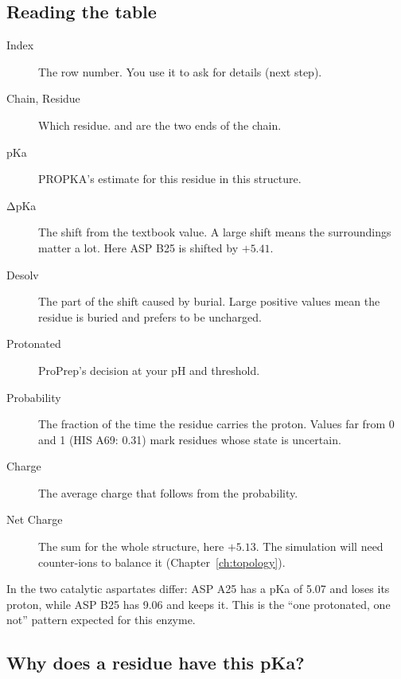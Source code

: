 \subsection{Reading the table}

\begin{description}
  \item[Index] The row number. You use it to ask for details (next step).
  \item[Chain, Residue] Which residue.  and  are
        the two ends of the chain.
  \item[pKa] PROPKA's estimate for this residue in this structure.
  \item[ΔpKa] The shift from the textbook value. A large shift means the
        surroundings matter a lot. Here ASP B25 is shifted by $+5.41$.
  \item[Desolv] The part of the shift caused by burial. Large positive values
        mean the residue is buried and prefers to be uncharged.
  \item[Protonated] ProPrep's decision at your pH and threshold.
  \item[Probability] The fraction of the time the residue carries the proton.
        Values far from 0 and 1 (HIS A69: 0.31) mark residues whose state is
        uncertain.
  \item[Charge] The average charge that follows from the probability.
  \item[Net Charge] The sum for the whole structure, here $+5.13$. The
        simulation will need counter-ions to balance it
        (Chapter~\ref{ch:topology}).
\end{description}

In  the two catalytic aspartates differ: ASP A25 has a pKa of 5.07
and loses its proton, while ASP B25 has 9.06 and keeps it. This is the
``one protonated, one not'' pattern expected for this enzyme.

\subsection{Why does a residue have this pKa?}

